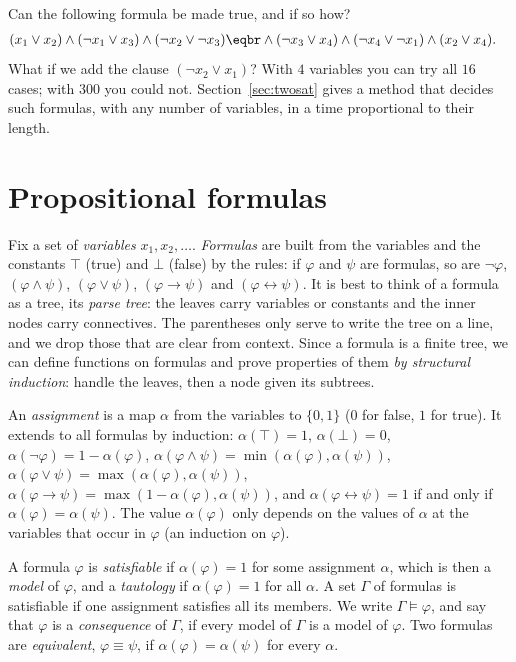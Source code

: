 \begin{think}
Can the following formula be made true, and if so how?
\[
\begin{aligned}{}&(x_1\lor x_2)\land(\neg x_1\lor x_3)\land(\neg x_2\lor\neg x_3)\eqbr\land(\neg x_3\lor x_4)\land(\neg x_4\lor\neg x_1)\land(x_2\lor x_4).\end{aligned}
\]
What if we add the clause $(\neg x_2\lor x_1)$? With $4$ variables you can try all $16$ cases; with $300$ you
could not. Section~\ref{sec:twosat} gives a method that decides such formulas, with any number of variables, in
a time proportional to their length.
\end{think}

\section{Propositional formulas}

Fix a set of \emph{variables} $x_1,x_2,\dots$. \emph{Formulas} are built from the variables and the constants $\top$
(true) and $\bot$ (false) by the rules: if $\varphi$ and $\psi$ are formulas, so are $\neg\varphi$, $(\varphi\land\psi)$,
$(\varphi\lor\psi)$, $(\varphi\to\psi)$ and $(\varphi\leftrightarrow\psi)$. It is best to think of a formula as a
tree, its \emph{parse tree}: the leaves carry variables or constants and the inner nodes carry connectives. The
parentheses only serve to write the tree on a line, and we drop those that are clear from context. Since a
formula is a finite tree, we can define functions on formulas and prove properties of them \emph{by structural
induction}: handle the leaves, then a node given its subtrees.

An \emph{assignment} is a map $\alpha$ from the variables to $\{0,1\}$ ($0$ for false, $1$ for true). It extends to all
formulas by induction: $\alpha(\top)=1$, $\alpha(\bot)=0$, $\alpha(\neg\varphi)=1-\alpha(\varphi)$, $\alpha(\varphi\land\psi)=\min(\alpha(\varphi),\alpha(\psi))$,
$\alpha(\varphi\lor\psi)=\max(\alpha(\varphi),\alpha(\psi))$, $\alpha(\varphi\to\psi)=\max(1-\alpha(\varphi),\alpha(\psi))$, and $\alpha(\varphi\leftrightarrow\psi)=1$ if and only
if $\alpha(\varphi)=\alpha(\psi)$. The value $\alpha(\varphi)$ only depends on the values of $\alpha$ at the variables that occur in $\varphi$ (an
induction on $\varphi$).

\begin{definition}\label{def:sat}
A formula $\varphi$ is \emph{satisfiable} if $\alpha(\varphi)=1$ for some assignment $\alpha$, which is then a \emph{model} of
$\varphi$, and a \emph{tautology} if $\alpha(\varphi)=1$ for all $\alpha$. A set $\Gamma$ of formulas is satisfiable if one
assignment satisfies all its members. We write $\Gamma\models\varphi$, and say that $\varphi$ is a \emph{consequence} of
$\Gamma$, if every model of $\Gamma$ is a model of $\varphi$. Two formulas are \emph{equivalent}, $\varphi\equiv\psi$, if
$\alpha(\varphi)=\alpha(\psi)$ for every $\alpha$.
\end{definition}

